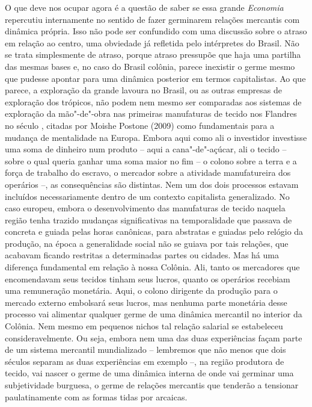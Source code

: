 O que deve nos ocupar agora é a questão de saber se essa grande \emph{Economia}
repercutiu internamente no sentido de fazer germinarem relações
mercantis com dinâmica própria. Isso não pode ser confundido com uma
discussão sobre o atraso em relação ao centro, uma obviedade já
refletida pelo intérpretes do Brasil. Não se trata simplesmente de
atraso, porque atraso pressupõe que haja uma partilha das mesmas bases
e, no caso do Brasil colônia, parece inexistir o germe mesmo que pudesse
apontar para uma dinâmica posterior em termos capitalistas. Ao que
parece, a exploração da grande lavoura no Brasil, ou as outras empresas
de exploração dos trópicos, não podem nem mesmo ser comparadas aos
sistemas de exploração da mão"-de"-obra nas primeiras manufaturas de
tecido nos Flandres no século , citadas por Moishe Postone (2009)
como fundamentais para a mudança de mentalidade na Europa. Embora aqui
como ali o investidor investisse uma soma de dinheiro num produto --
aqui a cana"-de"-açúcar, ali o tecido -- sobre o qual queria ganhar uma
soma maior no fim -- o colono sobre a terra e a força de trabalho do
escravo, o mercador sobre a atividade manufatureira dos operários --, as
consequências são distintas. Nem um dos dois processos estavam incluídos
necessariamente dentro de um contexto capitalista generalizado. No caso
europeu, embora o desenvolvimento das manufaturas de tecido naquela
região tenha trazido mudanças significativas na temporalidade que
passava de concreta e guiada pelas horas canônicas, para abstratas e
guiadas pelo relógio da produção, na época a generalidade social não se
guiava por tais relações, que acabavam ficando restritas a determinadas
partes ou cidades. Mas há uma diferença fundamental em relação à nossa
Colônia. Ali, tanto os mercadores que encomendavam seus tecidos tinham
seus lucros, quanto os operários recebiam uma remuneração monetária.
Aqui, o colono dirigente da produção para o mercado externo embolsará
seus lucros, mas nenhuma parte monetária desse processo vai alimentar
qualquer germe de uma dinâmica mercantil no interior da Colônia. Nem
mesmo em pequenos nichos tal relação salarial se estabeleceu
consideravelmente. Ou seja, embora nem uma das duas experiências façam
parte de um sistema mercantil mundializado -- lembremos que não menos
que dois séculos separam as duas experiências em exemplo --, na região
produtora de tecido, vai nascer o germe de uma dinâmica interna de onde
vai germinar uma subjetividade burguesa, o germe de relações mercantis
que tenderão a tensionar paulatinamente com as formas tidas por
arcaicas.

